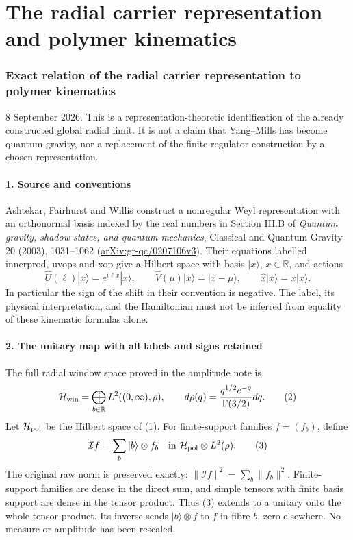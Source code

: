 \documentclass[
  11pt,
]{article}
\begin{document}
\clearpage
\part{The radial carrier representation and polymer kinematics}
\section{Exact relation of the radial carrier representation to polymer
kinematics}\label{weak-coupling-part-8-exact-relation-of-the-radial-carrier-representation-to-polymer-kinematics}

8 September 2026. This is a representation-theoretic identification of
the already constructed global radial limit. It is not a claim that
Yang--Mills has become quantum gravity, nor a replacement of the
finite-regulator construction by a chosen representation.

\subsection{1. Source and conventions}\label{weak-coupling-part-8-source-and-conventions}

Ashtekar, Fairhurst and Willis construct a nonregular Weyl
representation with an orthonormal basis indexed by the real numbers in
Section III.B of \emph{Quantum gravity, shadow states, and quantum
mechanics}, Classical and Quantum Gravity 20 (2003), 1031--1062
(\href{https://arxiv.org/abs/gr-qc/0207106v3}{arXiv:gr-qc/0207106v3}).
Their equations labelled innerprod, uvops and xop give a Hilbert space
with basis \(|x\rangle\), \(x\in\mathbb R\), and actions \[
 \widehat U(\ell)|x\rangle=e^{i\ell x}|x\rangle,\qquad
 \widehat V(\mu)|x\rangle=|x-\mu\rangle,\qquad
 \widehat x|x\rangle=x|x\rangle.
 \tag{1}
\] In particular the sign of the shift in their convention is negative.
The label, its physical interpretation, and the Hamiltonian must not be
inferred from equality of these kinematic formulas alone.

\subsection{2. The unitary map with all labels and signs
retained}\label{weak-coupling-part-8-the-unitary-map-with-all-labels-and-signs-retained}

The full radial window space proved in the amplitude note is \[
 \mathcal H_{\rm win}
 =\bigoplus_{b\in\mathbb R}L^2((0,\infty),\rho),\qquad
 d\rho(q)=\frac{q^{1/2}e^{-q}}{\Gamma(3/2)}dq .
 \tag{2}
\] Let \(\mathcal H_{\rm pol}\) be the Hilbert space of (1). For
finite-support families \(f=(f_b)\), define \[
 \mathcal I f=\sum_b |b\rangle\otimes f_b
       \quad\hbox{in }\mathcal H_{\rm pol}\otimes L^2(\rho).
 \tag{3}
\] The original raw norm is preserved exactly:
\(\|\mathcal I f\|^2=\sum_b\|f_b\|^2\). Finite-support families are
dense in the direct sum, and simple tensors with finite basis support
are dense in the tensor product. Thus (3) extends to a unitary onto the
whole tensor product. Its inverse sends \(|b\rangle\otimes f\) to \(f\)
in fibre \(b\), zero elsewhere. No measure or amplitude has been
rescaled.
\end{document}
